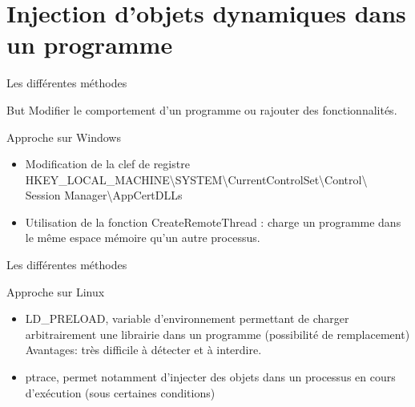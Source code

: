 \section{Injection d'objets dynamiques dans un programme}

\frame{\tableofcontents[currentsection]}


\begin{frame}{Les différentes méthodes}

	\begin{alertblock}{But}
	Modifier le comportement d'un programme ou rajouter des fonctionnalités.
	\end{alertblock}
	
    \begin{block}{Approche sur Windows}
    	\begin{itemize}
		 \item Modification de la clef de registre HKEY\_LOCAL\_MACHINE\textbackslash SYSTEM\textbackslash	  CurrentControlSet\textbackslash Control\textbackslash \\ Session Manager\textbackslash AppCertDLLs
		
		\item Utilisation de la fonction CreateRemoteThread : charge un programme dans le même espace mémoire
		qu'un autre processus.
	    \end{itemize}
    \end{block}	
		
\end{frame}

\begin{frame}{Les différentes méthodes}

	\begin{block}{Approche sur Linux}
	
	\begin{itemize}
		\item LD\_PRELOAD, variable d'environnement permettant de charger arbitrairement une librairie dans un programme (possibilité de remplacement)\\Avantages: très difficile à détecter et à interdire.
		\item ptrace, permet notamment d'injecter des objets dans un processus en cours d'exécution (sous certaines conditions)
	\end{itemize}
	
	\end{block}
	
\end{frame}

